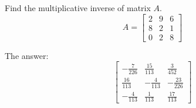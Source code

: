 
\begin{question}
Find the multiplicative inverse of matrix \(A\).
\[A = \left[\begin{matrix}2 & 9 & 6\\8 & 2 & 1\\0 & 2 & 8\end{matrix}\right]\]
\end{question}

\begin{solution}
The answer:
\[\left[\begin{matrix}- \frac{7}{226} & \frac{15}{113} & \frac{3}{452}\\\frac{16}{113} & - \frac{4}{113} & - \frac{23}{226}\\- \frac{4}{113} & \frac{1}{113} & \frac{17}{113}\end{matrix}\right]\]
\end{solution}

